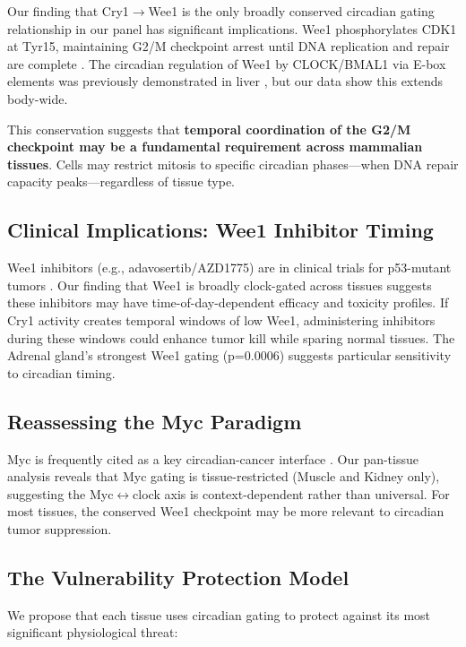 \documentclass[11pt,letterpaper]{article}
\begin{document}
Our finding that Cry1$\rightarrow$Wee1 is the only broadly conserved circadian gating relationship in our panel has significant implications. Wee1 phosphorylates CDK1 at Tyr15, maintaining G2/M checkpoint arrest until DNA replication and repair are complete \citep{mcgowan1995}. The circadian regulation of Wee1 by CLOCK/BMAL1 via E-box elements was previously demonstrated in liver \citep{matsuo2003}, but our data show this extends body-wide.

This conservation suggests that \textbf{temporal coordination of the G2/M checkpoint may be a fundamental requirement across mammalian tissues}. Cells may restrict mitosis to specific circadian phases---when DNA repair capacity peaks---regardless of tissue type.

\subsection{Clinical Implications: Wee1 Inhibitor Timing}

Wee1 inhibitors (e.g., adavosertib/AZD1775) are in clinical trials for p53-mutant tumors \citep{leijen2016}. Our finding that Wee1 is broadly clock-gated across tissues suggests these inhibitors may have time-of-day-dependent efficacy and toxicity profiles. If Cry1 activity creates temporal windows of low Wee1, administering inhibitors during these windows could enhance tumor kill while sparing normal tissues. The Adrenal gland's strongest Wee1 gating (p=0.0006) suggests particular sensitivity to circadian timing.

\subsection{Reassessing the Myc Paradigm}

Myc is frequently cited as a key circadian-cancer interface \citep{altman2015}. Our pan-tissue analysis reveals that Myc gating is tissue-restricted (Muscle and Kidney only), suggesting the Myc$\leftrightarrow$clock axis is context-dependent rather than universal. For most tissues, the conserved Wee1 checkpoint may be more relevant to circadian tumor suppression.

\subsection{The Vulnerability Protection Model}

We propose that each tissue uses circadian gating to protect against its most significant physiological threat:
\end{document}
